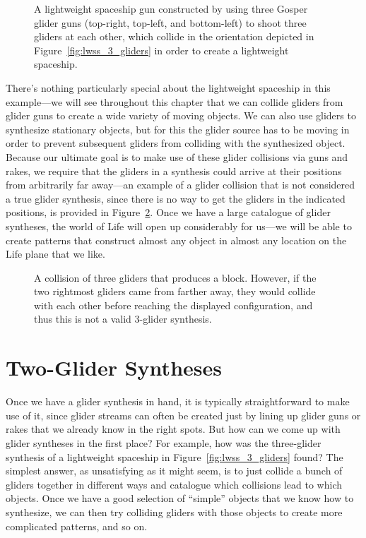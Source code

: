 \begin{figure}[!ht]
	\centering{}
	\caption{A lightweight spaceship gun constructed by using three Gosper glider guns (top-right, top-left, and bottom-left) to shoot three gliders at each other, which collide in the orientation depicted in Figure~\ref{fig:lwss_3_gliders} in order to create a lightweight spaceship.}\label{fig:lwss_gun}
\end{figure}

There's nothing particularly special about the lightweight spaceship in this example---we will see throughout this chapter that we can collide gliders from glider guns to create a wide variety of moving objects. We can also use gliders to synthesize stationary objects, but for this the glider source has to be moving in order to prevent subsequent gliders from colliding with the synthesized object. Because our ultimate goal is to make use of these glider collisions via guns and rakes, we require that the gliders in a synthesis could arrive at their positions from arbitrarily far away---an example of a glider collision that is not considered a true glider synthesis, since there is no way to get the gliders in the indicated positions, is provided in Figure~\ref{fig:invalid_synthesis}. Once we have a large catalogue of glider syntheses, the world of Life will open up considerably for us---we will be able to create patterns that construct almost any object in almost any location on the Life plane that we like. 

\begin{figure}[!ht]
	\centering{}
	\caption{A collision of three gliders that produces a block. However, if the two rightmost gliders came from farther away, they would collide with each other before reaching the displayed configuration, and thus this is not a valid $3$-glider synthesis.}\label{fig:invalid_synthesis}
\end{figure}


\section{Two-Glider Syntheses}\label{sec:2glidersynth}

Once we have a glider synthesis in hand, it is typically straightforward to make use of it, since glider streams can often be created just by lining up glider guns or rakes that we already know in the right spots. But how can we come up with glider syntheses in the first place? For example, how was the three-glider synthesis of a lightweight spaceship in Figure~\ref{fig:lwss_3_gliders} found? The simplest answer, as unsatisfying as it might seem, is to just collide a bunch of gliders together in different ways and catalogue which collisions lead to which objects. Once we have a good selection of ``simple'' objects that we know how to synthesize, we can then try colliding gliders with those objects to create more complicated patterns, and so on.

